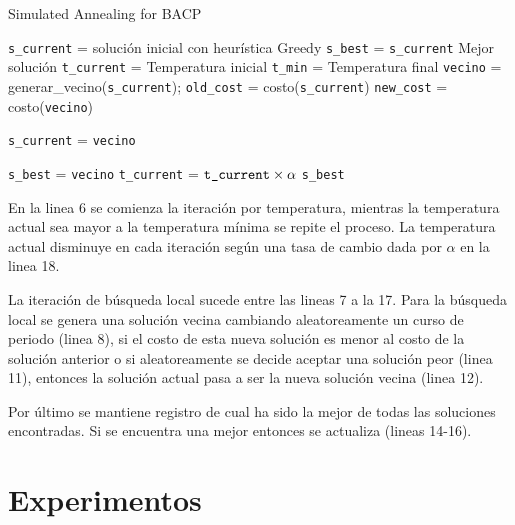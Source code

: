 \documentclass[letterpaper,10pt]{article}
\begin{document}
\begin{algorithm}[H]
\caption{Simulated Annealing for BACP}
\label{SimulatedAnnealingAlgo}
\begin{algorithmic}[1]
 {}
     \State \texttt{s\_current} = solución inicial con heurística Greedy
     \State \texttt{s\_best} = \texttt{s\_current} Mejor solución
     \State \texttt{t\_current} = Temperatura inicial
     \State \texttt{t\_min} = Temperatura final
          \State \texttt{vecino} = generar\_vecino(\texttt{s\_current});
          \State \texttt{old\_cost} = costo(\texttt{s\_current})
          \State \texttt{new\_cost} = costo(\texttt{vecino})

            \State \texttt{s\_current} = \texttt{vecino}
          \EndIf

            \State \texttt{s\_best} = \texttt{vecino}
          \EndIf
        \EndFor
        \State \texttt{t\_current} = $\text{\texttt{t\_current}}\times \alpha$
     \EndWhile
     \State \Return \texttt{s\_best}
\EndProcedure
\end{algorithmic}
\end{algorithm}

En la linea 6 se comienza la iteración por temperatura, mientras la temperatura actual sea mayor a la temperatura mínima se repite el proceso. La temperatura actual disminuye en cada iteración según una tasa de cambio dada por $\alpha$ en la linea 18.

La iteración de búsqueda local sucede entre las lineas 7 a la 17. Para la búsqueda local se genera una solución vecina cambiando aleatoreamente un curso de periodo (linea 8), si el costo de esta nueva solución es menor al costo de la solución anterior o si aleatoreamente se decide aceptar una solución peor (linea 11), entonces la solución actual pasa a ser la nueva solución vecina (linea 12).

Por último se mantiene registro de cual ha sido la mejor de todas las soluciones encontradas. Si se encuentra una mejor entonces se actualiza (lineas 14-16).

\section{Experimentos}
\end{document}
